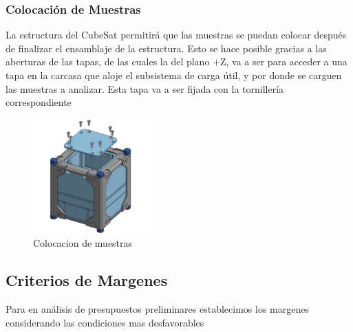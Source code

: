     \subsubsection{Colocación de Muestras}

      La estructura del CubeSat permitirá que las muestras se puedan colocar después de
      finalizar el ensamblaje de la estructura. Esto se hace posible gracias a las aberturas de las
      tapas, de las cuales la del plano +Z, va a ser para acceder a una tapa en la carcasa que aloje
      el subsistema de carga útil, y por donde se carguen las muestras a analizar. Esta tapa va a
      ser fijada con la tornillería correspondiente

      \begin{figure}[H]
        \centering
        \includegraphics[width=0.4\textwidth]{image/structure/muestras.png}
        \caption{Colocacion de muestras}
        \label{fig:structure-muestra}
      \end{figure}

  \subsection{Criterios de Margenes}
    Para en análisis de presupuestos preliminares establecimos los margenes considerando las
    condiciones mas desfavorables

